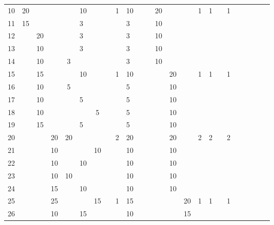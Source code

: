 \begin{table}[h!]
\begin{tabular}{r|g c g c g c g c g c g c g c g c g c g c g c g}
  10 & 20 &    &    &    & 10 &    &    & 1 & 10 &    &    & 20 &    &    & 1 & 1 &    & 1 &   &   &   &   &   \\
  11 & 15 &    &    &    &  3 &    &    &   &  3 &    &    & 10 &    &    &   &   &    &   &   &   &   &   &   \\
  12 &    & 20 &    &    &  3 &    &    &   &  3 &    &    & 10 &    &    &   &   &    &   &   &   &   &   &   \\
  13 &    & 10 &    &    &  3 &    &    &   &  3 &    &    & 10 &    &    &   &   &    &   &   &   &   &   &   \\
  14 &    & 10 &    &  3 &    &    &    &   &  3 &    &    & 10 &    &    &   &   &    &   &   &   &   &   &   \\
  15 &    & 15 &    &    & 10 &    &    & 1 & 10 &    &    &    & 20 &    & 1 & 1 &    & 1 &   &   &   &   &   \\
  16 &    & 10 &    &  5 &    &    &    &   &  5 &    &    &    & 10 &    &   &   &    &   &   &   &   &   &   \\
  17 &    & 10 &    &    &  5 &    &    &   &  5 &    &    &    & 10 &    &   &   &    &   &   &   &   &   &   \\
  18 &    & 10 &    &    &    &  5 &    &   &  5 &    &    &    & 10 &    &   &   &    &   &   &   &   &   &   \\
  19 &    & 15 &    &    &  5 &    &    &   &  5 &    &    &    & 10 &    &   &   &    &   &   &   &   &   &   \\
  20 &    &    & 20 & 20 &    &    &    & 2 & 20 &    &    &    & 20 &    & 2 & 2 &    & 2 &   &   &   &   &   \\
  21 &    &    & 10 &    &    & 10 &    &   & 10 &    &    &    & 10 &    &   &   &    &   &   &   &   &   &   \\
  22 &    &    & 10 &    & 10 &    &    &   & 10 &    &    &    & 10 &    &   &   &    &   &   &   &   &   &   \\
  23 &    &    & 10 & 10 &    &    &    &   & 10 &    &    &    & 10 &    &   &   &    &   &   &   &   &   &   \\
  24 &    &    & 15 &    & 10 &    &    &   & 10 &    &    &    & 10 &    &   &   &    &   &   &   &   &   &   \\
  25 &    &    & 25 &    &    & 15 &    & 1 & 15 &    &    &    &    & 20 & 1 & 1 &    & 1 &   &   &   &   &   \\
  26 &    &    & 10 &    & 15 &    &    &   & 10 &    &    &    &    & 15 &   &   &    &   &   &   &   &   &   \\

\end{tabular}
\end{table}
